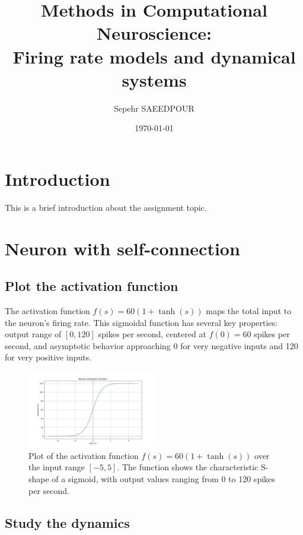 \documentclass{article}
\title{Methods in Computational Neuroscience:\\Firing rate models and dynamical systems}
\author{Sepehr SAEEDPOUR}
\date{\today}
\begin{document}
\maketitle

\section*{Introduction}
This is a brief introduction about the assignment topic.

\section{Neuron with self-connection}

\subsection{Plot the activation function}

The activation function $f(s) = 60(1 + \tanh(s))$ maps the total input to the neuron's firing rate. 
This sigmoidal function has several key properties: output range of $[0, 120]$ spikes per second, centered at $f(0) = 60$ spikes per second, and asymptotic behavior approaching 0 for very negative inputs and 120 for very positive inputs. 



\begin{figure}[H]
    \centering
    \includegraphics[width=0.5\textwidth]{activation_function.png}
    \caption{Plot of the activation function $f(s) = 60(1 + \tanh(s))$ over the input range $[-5, 5]$. The function shows the characteristic S-shape of a sigmoid, with output values ranging from 0 to 120 spikes per second.}
    \label{fig:activation}
\end{figure}

\subsection{Study the dynamics}
\end{document}
